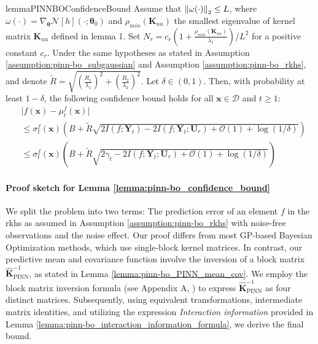 \begin{restatable}{lemma}{PINNBOConfidenceBound}
\label{lemma:pinn-bo_confidence_bound}
     Assume that $\norm{\omega(\cdot)}_2 \le L$, where $\omega(\cdot)  = \nabla_{\boldsymbol{\theta}} \mathcal{N}[h] (\cdot; \boldsymbol{\theta}_0)$ and $\rho_{min}(\mathbf{K}_{uu})$ the smallest eigenvalue of kernel matrix $\mathbf{K}_{uu}$ defined in lemma 1. Set $N_r = c_r\left(1+ \frac{\rho_{min}(\mathbf{K}_{uu})}{\lambda_1}\right)/L^2$ for a positive constant $c_r$. Under the same hypotheses as stated in Assumption \ref{assumption:pinn-bo_subgaussian} and Assumption \ref{assumption:pinn-bo_rkhs}, and denote $\widetilde{R} = \sqrt{\left(\frac{R_1}{\lambda_1}\right)^2 + \left(\frac{R_2}{\lambda_2}\right)^2}$. Let $\delta \in (0,1)$. Then,  with  probability at least $1 - \delta$, the following confidence bound holds for all $\mathbf{x} \in \mathcal{D}$ and $t \ge 1$:
    \begin{equation*}
    \begin{aligned}
            & \lvert f(\mathbf{x}) - \mu_t^f(\mathbf{x}) \rvert \\
            & \le \sigma_t^f(\mathbf{x}) \left(B +   \widetilde{R}\sqrt{2 I (f; \mathbf{Y}_t) - 2I (f; \mathbf{Y}_t; \mathbf{U}_r) + \mathcal{O}(1) + \log(1/\delta)}  \right) \\
            & \le \sigma_t^f(\mathbf{x}) \left(B +   \widetilde{R}\sqrt{2 \gamma_t - 2I (f; \mathbf{Y}_t; \mathbf{U}_r) + \mathcal{O}(1) + \log(1/\delta)}  \right)
        \end{aligned}
    \end{equation*}
\end{restatable}
\paragraph{Proof sketch for Lemma \ref{lemma:pinn-bo_confidence_bound}}
We split the problem into two terms: The prediction error of an element $f$ in the \ac{rkhs} as assumed in Assumption \ref{assumption:pinn-bo_rkhs} with noise-free observations and the noise effect. Our proof differs from most GP-based Bayesian Optimization methods, which use single-block kernel matrices. In contrast, our predictive mean and covariance function involve the inversion of a block matrix  $\mathbf{\widehat{K}}_\mathrm{PINN}^{-1}$, as stated in Lemma \ref{lemma:pinn-bo_PINN_mean_cov}. We employ the block matrix inversion formula (see Appendix A, \citep{rasmussen2006gaussian}) to express $\mathbf{\widehat{K}}_\mathrm{PINN}^{-1}$ as four distinct matrices. Subsequently, using equivalent transformations, intermediate matrix identities, and utilizing the expression \textit{Interaction information} provided in Lemma \ref{lemma:pinn-bo_interaction_information_formula}, we derive the final bound. 

